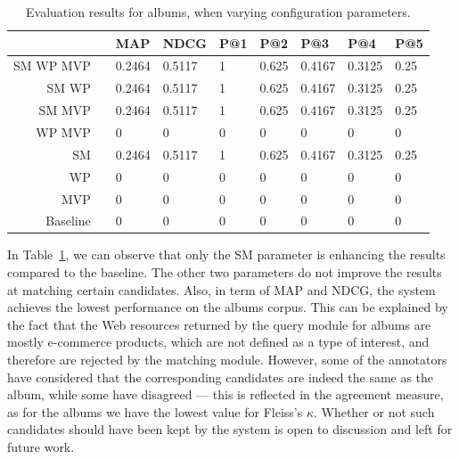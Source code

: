 \begin{table}[htb]
\centering
{}
\begin{tabular}{@{}rcl@{\hs}l@{\hs}l@{\hs}l@{\hs}l@{\hs}l@{\hs}l@{}}
\toprule
& \phantom{a} & MAP & NDCG & P@1 & P@2 & P@3 & P@4 & P@5 \\ 
\midrule

 SM WP MVP && 0.2464 & 0.5117 & 1 & 0.625 & 0.4167 & 0.3125 & 0.25 \\ %

 SM WP && 0.2464 & 0.5117 & 1 & 0.625 & 0.4167 & 0.3125 & 0.25 \\ %

 SM MVP && 0.2464 & 0.5117 & 1 & 0.625 & 0.4167 & 0.3125 & 0.25 \\ %

 WP MVP && 0 & 0 & 0 & 0 & 0 & 0 & 0 \\ %

 SM && 0.2464 & 0.5117 & 1 & 0.625 & 0.4167 & 0.3125 & 0.25 \\ %

 WP && 0 & 0 & 0 & 0 & 0 & 0 & 0 \\ %

 MVP && 0 & 0 & 0 & 0 & 0 & 0 & 0 \\ %

 Baseline && 0 & 0 & 0 & 0 & 0 & 0 & 0 \\ %

\bottomrule
\end{tabular}
\caption{Evaluation results for albums, when varying configuration parameters.}
\label{tab:agreement-albums}
\end{table}

In Table~\ref{tab:agreement-albums}, we can observe that only the SM parameter is enhancing the results compared to the baseline. The other two parameters do not improve the results at matching certain candidates. Also, in term of MAP and NDCG, the system achieves the lowest performance on the albums corpus. This can be explained by the fact that the Web resources returned by the query module for albums are mostly e-commerce products, which are not defined as a type of interest, and therefore are rejected by the matching module. However, some of the annotators have considered that the corresponding candidates are indeed the same as the album, while some have disagreed --- this is reflected in the agreement measure, as for the albums we have the lowest value for Fleiss's $\kappa$. Whether or not such candidates should have been kept by the system is open to discussion and left for future work.

